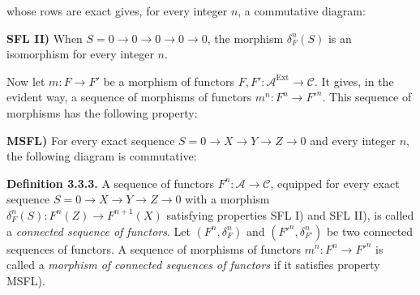 \clearpage
{}%
\begingroup\small\setlength{\parskip}{0pt}\setlength{\emergencystretch}{1.5em}
\setlength{\abovedisplayskip}{4pt plus 2pt minus 2pt}%
\setlength{\belowdisplayskip}{4pt plus 2pt minus 2pt}%

whose rows are exact gives, for every integer $n$, a commutative diagram:
\begin{center}
\end{center}

\noindent\textbf{SFL II)} When
$S=0\longrightarrow0\longrightarrow0\longrightarrow0\longrightarrow0$,
the morphism $\delta_F^n(S)$ is an isomorphism for every integer $n$.

Now let $m\colon F\longrightarrow F'$ be a morphism of functors
$F,F'\colon\mathcal A^{\operatorname{Ext}}\longrightarrow\mathcal C$.
It gives, in the evident way, a sequence of morphisms of functors
$m^n\colon F^n\longrightarrow {F'}^n$. This sequence of morphisms has the
following property:

\noindent\textbf{MSFL)} For every exact sequence
$S=0\longrightarrow X\longrightarrow Y\longrightarrow Z\longrightarrow0$
and every integer $n$, the following diagram is commutative:

\begin{center}
\end{center}

\medskip\noindent\textbf{Definition 3.3.3.}\quad
A sequence of functors $F^n\colon\mathcal A\longrightarrow\mathcal C$,
equipped for every exact sequence
$S=0\longrightarrow X\longrightarrow Y\longrightarrow Z\longrightarrow0$
with a morphism
$\delta_F^n(S)\colon F^n(Z)\longrightarrow F^{n+1}(X)$ satisfying
properties SFL I) and SFL II), is called a \emph{connected sequence of
functors}. Let $(F^n,\delta_F^n)$ and $({F'}^n,\delta_{F'}^n)$ be two
connected sequences of functors. A sequence of morphisms of functors
$m^n\colon F^n\longrightarrow {F'}^n$ is called a \emph{morphism of
connected sequences of functors} if it satisfies property MSFL).

